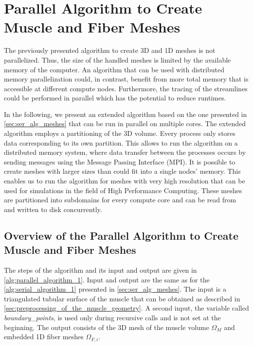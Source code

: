 
\setcounter{section}{4}
\section{Parallel Algorithm to Create Muscle and Fiber Meshes}\label{sec:parallel_algorithm}
%

The previously presented algorithm to create 3D and 1D meshes is not parallelized. 
Thus, the size of the handled meshes is limited by the available memory of the computer.
An algorithm that can be used with distributed memory parallelization could, in contrast, benefit from more total memory that is accessible at different compute nodes. Furthermore, the tracing of the streamlines could be performed in parallel which has the potential to reduce runtimes.

In the following, we present an extended algorithm based on the one presented in \cref{sec:ser_alg_meshes} that can be run in parallel on multiple cores. The extended algorithm employs a partitioning of the 3D volume. Every process only stores data corresponding to its own partition. This allows to run the algorithm on a distributed memory system, where data transfer between the processes occurs by sending messages using the Message Passing Interface (MPI). It is possible to create meshes with larger sizes than could fit into a single nodes' memory. This enables us to run the algorithm for meshes with very high resolution that can be used for simulations in the field of High Performance Computing. 
These meshes are partitioned into subdomains for every compute core and can be read from and written to disk concurrently.

\subsection{Overview of the Parallel Algorithm to Create Muscle and Fiber Meshes}

The steps of the algorithm and its input and output are given in \cref{alg:parallel_algorithm_1}. Input and output are the same as for the \cref{alg:serial_algorithm_1} presented in \cref{sec:ser_alg_meshes}. The input is a triangulated tubular surface of the muscle that can be obtained as described in \cref{sec:preprocessing_of_the_muscle_geometry}. A second input, the variable called \emph{boundary\_points}, is used only during recursive calls and is not set at the beginning. The output consists of the 3D mesh of the muscle volume $\Omega_M$ and embedded 1D fiber meshes $\Omega_{F,i}$. 

